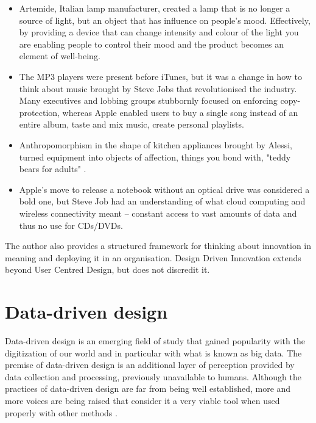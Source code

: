 \begin{itemize}
\item Artemide, Italian lamp manufacturer, created a lamp that is no longer a source of light, but an object that has influence on people's mood. Effectively, by providing a device that can change intensity and colour of the light you are enabling people to control their mood and the product becomes an element of well-being.

\item The MP3 players were present before iTunes, but it was a change in how to think about music brought by Steve Jobs that revolutionised the industry. Many executives and lobbing groups stubbornly focused on enforcing copy-protection, whereas Apple enabled users to buy a single song instead of an entire album, taste and mix music, create personal playlists.

\item Anthropomorphism in the shape of kitchen appliances brought by Alessi, turned equipment into objects of affection, things you bond with, "teddy bears for adults" \citep{verganti2013design}.

\item Apple's move to release a notebook without an optical drive was considered a bold one, but Steve Job had an understanding of what cloud computing and wireless connectivity meant – constant access to vast amounts of data and thus no use for CDs/DVDs.
\end{itemize}

The author also provides a structured framework for thinking about innovation in meaning and deploying it in an organisation. Design Driven Innovation extends beyond User Centred Design, but does not discredit it.

	\section{Data-driven design}
	
Data-driven design is an emerging field of study that gained popularity with the digitization of our world and in particular with what is known as big data. The premise of data-driven design is an additional layer of perception provided by data collection and processing, previously unavailable to humans. Although the practices of data-driven design are far from being well established, more and more voices are being raised that consider it a very viable tool when used properly with other methods \citep{Neirotti2014}.
	
